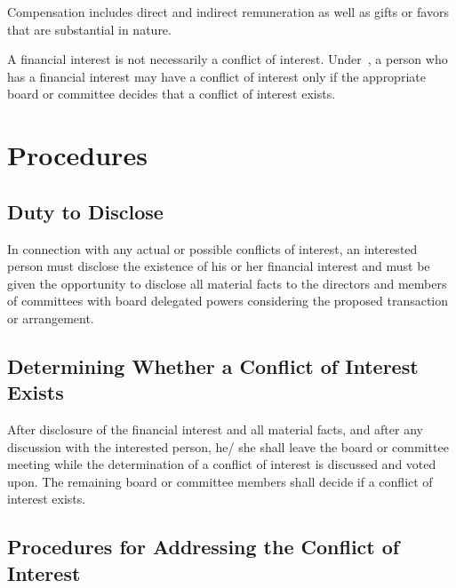 \documentclass[12pt]{article}
\begin{document}
Compensation includes direct and indirect remuneration as well as 
gifts or favors that are substantial in nature. 

A financial interest is not necessarily a conflict of interest. 
Under~,  a 
person who has a financial interest may have a conflict of 
interest only if the appropriate board or committee decides that 
a conflict of interest exists. 

\section{Procedures}\label{sec:procedures}

\subsection{Duty to Disclose}

In connection with any actual or possible conflicts of interest, 
an interested person must disclose the existence of his or her 
financial interest and must be given the opportunity to disclose 
all material facts to the directors and members of committees 
with board delegated powers considering the proposed transaction 
or arrangement. 

\subsection{Determining Whether a Conflict of Interest Exists}
\label{sec:conflict_exists}

After disclosure of the financial interest and all material 
facts, and after any discussion with the interested person, he/
she shall leave the board or committee meeting while the 
determination of a conflict of interest is discussed and voted 
upon. The remaining board or committee members shall decide if a 
conflict of interest exists. 

\subsection{Procedures for Addressing the Conflict of Interest}
\end{document}
